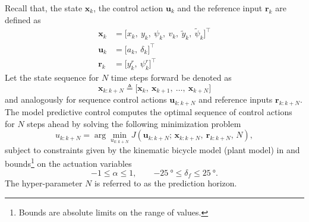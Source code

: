 \documentclass[a4paper]{article}
\begin{document}
Recall that, the state \( \bm{x}_k \), the control action \( \bm{u}_k \) and the reference input \( \bm{r}_k \) are defined as
\begin{align}
	\bm{x}_k &= \big[x_k,\ y_k,\ \psi_k,\ v_k,\ \tilde{y}_k,\ \tilde{\psi}_k \big]^\top \\
	\bm{u}_k &= \big[a_k,\ \delta_k\big]^\top \\
	\bm{r}_k &= \big[y^r_k,\ \psi^r_k \big]^\top
\end{align}
Let the state sequence for \( N \) time steps forward be denoted as 
\begin{equation}
	\bm{x}_{k:k+N} \triangleq \big[ \bm{x}_k,\ \bm{x}_{k+1},\ \ldots,\ \bm{x}_{k+N} \big]
\end{equation}
and analogously for sequence control actions \(  \bm{u}_{k:k+N} \) and reference inputs \( \bm{r}_{k:k+N} \).
The model predictive control computes the optimal sequence of control actions for \( N \) steps ahead by solving the following minimization problem
\begin{equation}
u_{k:k+N} = \arg\min_{u_{k:k+N}} J(\bm{u}_{k:k+N};\, \bm{x}_{k:k+N},\ \bm{r}_{k:k+N},\, N),
\end{equation}
subject to constraints given by the kinematic bicycle model (plant model) in  and bounds\footnote{Bounds are absolute limits on the range of values.} on the actuation variables
\begin{equation}\label{eq:mpc_actuation_bounds}
-1 \leq \alpha \leq 1 ,\qquad \SI{-25}{\degree} \leq \delta_f \leq \SI{25}{\degree}.
\end{equation}
The hyper-parameter \( N \) is referred to as the prediction horizon.
\end{document}
